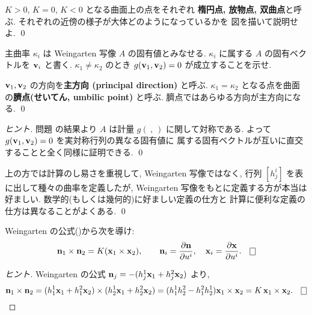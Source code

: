 \documentclass[12pt,twoside]{jarticle}
\begin{document}
\begin{question}
 $K>0$, $K=0$, $K<0$ となる曲面上の点をそれぞれ
 {\bf 楕円点, 放物点, 双曲点}と呼ぶ.
 それぞれの近傍の様子が大体どのようになっているかを
 図を描いて説明せよ. 
 \qed
\end{question}

\begin{question}[主方向と臍点]
 主曲率 $\kappa_i$ は Weingarten 写像 $A$ の固有値とみなせる.
 $\kappa_i$ に属する $A$ の固有ベクトルを ${\mathbf v}_i$ と書く.
 $\kappa_1\ne\kappa_2$ のとき $g({\mathbf v}_1,{\mathbf v}_2)=0$ が成立することを示せ.

 ${\mathbf v}_1,{\mathbf v}_2$ の方向を{\bf 主方向 (principal direction)} と呼ぶ.
 $\kappa_1=\kappa_2$ となる点を曲面の{\bf 臍点(せいてん, umbilic point)} 
 と呼ぶ. 臍点ではあらゆる方向が主方向になる.
 \qed
\end{question}

\begin{proof}[ヒント]
 問題  の結果より $A$ は計量 $g(\ ,\ )$ に関して対称である.
 よって $g({\mathbf v}_1,{\mathbf v}_2)=0$ を実対称行列の異なる固有値に
 属する固有ベクトルが互いに直交することと全く同様に証明できる.
 \qed
\end{proof}

\begin{rem}
 上の方では計算のし易さを重視して, Weingarten 写像ではなく, 
 行列 $[h^i_j]$ を表に出して種々の曲率を定義したが, 
 Weingarten 写像をもとに定義する方が本当は好ましい.
 数学的(もしくは幾何的)に好ましい定義の仕方と
 計算に便利な定義の仕方は異なることがよくある.
 \qed
\end{rem}

\begin{question}
 Weingarten の公式()から次を導け:
 \begin{equation*}
  \n_1\times\n_2 = K(\x_1\times\x_2),
  \qquad
  \n_i=\pdfrac{\n}{u^i}, \quad \x_i=\pdfrac{\x}{u^i}.
  \qed
 \end{equation*}
\end{question}

\begin{proof}[ヒント]
 Weingarten の公式 ${\mathbf n}_j=-(h^1_j{\mathbf x}_1+h^2_j{\mathbf x}_2)$ より,
 \begin{equation*}
  \n_1\times\n_2
  =(h^1_1\x_1+h^2_1\x_2)\times(h^1_2\x_1+h^2_2\x_2)
  =(h^1_1h^2_2-h^2_1h^1_2)\x_1\times\x_2
  =K\,\x_1\times\x_2.
  \qed
 \end{equation*}
\end{proof}
\end{document}
